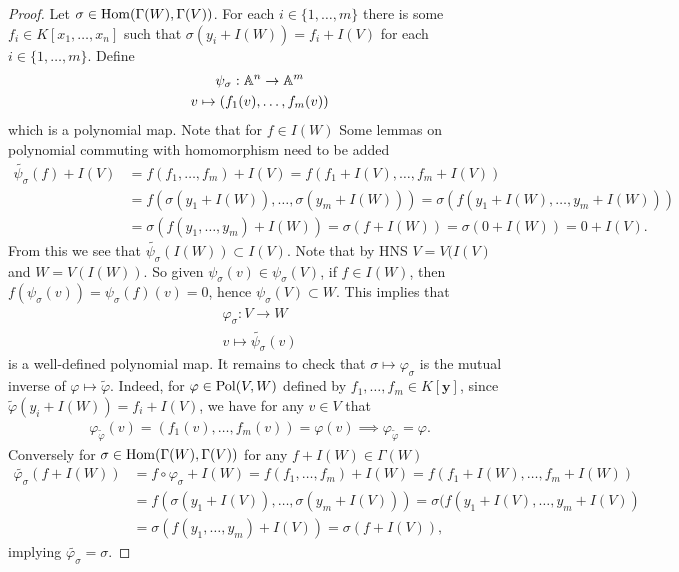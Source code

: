 \begin{proof}
    Let $\sigma \in \mathrm{Hom}(\Gamma(W),\Gamma(V))$. For each $i\in\{1,\dots,m\}$ there is some $f_i\in K[x_1,\dots,x_n]$ such that $\sigma(y_i + I(W)) = f_i + I(V)$ for each $i\in\{1,\dots,m\}$. Define
    \begin{gather*}
        \psi_\sigma : \mathbb{A}^n \rightarrow \mathbb{A}^m\\
        v\mapsto (f_1(v),\dots,f_m(v))
    \end{gather*}
    which is a polynomial map. Note that for $f\in I(W)$
    {\LARGE Some lemmas on polynomial commuting with homomorphism need to be added}
    \begin{align*}
        \widetilde{\psi_{\sigma}}(f) + I(V) &= f(f_1,\dots,f_m) + I(V) = f(f_1+I(V),\dots,f_m+I(V))\\ 
        &= f(\sigma(y_1+I(W)),\dots,\sigma(y_m+I(W))) = \sigma\left(f\left(y_1+I\left(W\right),\dots,y_m+I\left(W\right)\right)\right)\\ 
        &= \sigma( f(y_1,\dots,y_m)+I(W))=\sigma( f+I(W))=\sigma(0+I(W)) = 0 +I(V).
    \end{align*}
    From this we see that $\widetilde{\psi_\sigma}(I(W))\subset I(V)$. Note that by HNS $V = V(I(V)$ and $W = V(I(W))$.  So given $\psi_{\sigma}(v) \in \psi_{\sigma}(V)$, if $f\in I(W)$, then $f(\psi_\sigma(v))=\psi_\sigma(f)(v) = 0 $, hence $\psi_\sigma(V) \subset W$. This implies that 
    \begin{gather*}
        \varphi_\sigma : V \rightarrow W\\
        v\mapsto \widetilde{\psi_\sigma}(v)
    \end{gather*}
    is a well-defined polynomial map. It remains to check that $\sigma \mapsto \varphi_\sigma$ is the mutual inverse of $\varphi \mapsto \widetilde{\varphi}$. Indeed, for $\varphi\in \mathrm{Pol}(V,W)$ defined by $f_1,\dots,f_m\in K[\mathbf{y}]$, since $\widetilde{\varphi}(y_i+I(W))=f_i+I(V)$, we have for any $v\in V$ that
    \begin{align*}
        \varphi_{\widetilde{\varphi}}(v)= (f_1(v),\dots,f_m(v))=\varphi(v) \implies \varphi_{\widetilde{\varphi}} = \varphi.
    \end{align*}
    Conversely for $\sigma\in \mathrm{Hom}(\Gamma(W),\Gamma(V))$ for any $f + I(W) \in \Gamma(W)$
    \begin{align*}
        \widetilde{\varphi_\sigma}(f+I(W))&=f\circ \varphi_\sigma + I(W) =f(f_1,\dots,f_m) + I(W) = f(f_1+I(W),\dots, f_m+I(W))\\ 
        &= f(\sigma(y_1+I(V)),\dots, \sigma(y_m+I(V))) = \sigma(f(y_1+I(V),\dots,y_m+I(V))\\ 
        &= \sigma(f(y_1,\dots,y_m)+I(V))= \sigma(f+I(V)),
    \end{align*}
    implying $\widetilde{\varphi_\sigma} = \sigma$.
\end{proof}
